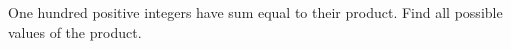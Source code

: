 One hundred positive integers have sum equal to their product. Find all possible values of the product.
